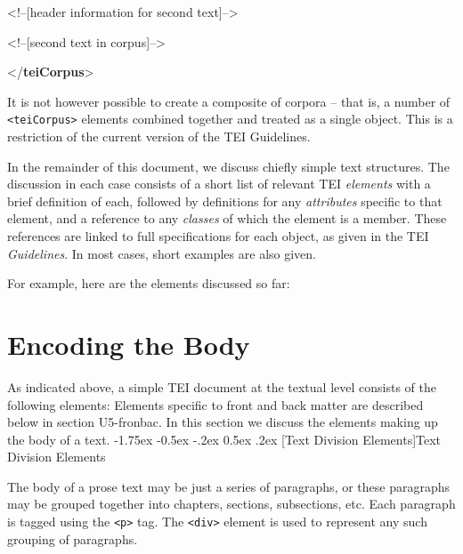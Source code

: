 \documentclass[11pt,twoside]{article}\makeatletter
\makeatletter
\renewcommand\section{\@startsection {section}{1}{\z@}%
     {-1.75ex \@plus -0.5ex \@minus -.2ex}%
     {0.5ex \@plus .2ex}%
     {\reset@font\Large\bfseries\sffamily}}
\renewcommand\subsection{\@startsection{subsection}{2}{\z@}%
     {-1.75ex\@plus -0.5ex \@minus- .2ex}%
     {0.5ex \@plus .2ex}%
     {\reset@font\Large\sffamily}}
\def\DivI{\section}
\def\DivII{\subsection}
\def\DivI{\chapter}
\def\DivII{\section}
\makeatother
\begin{document}
\begin{shaded}
\begin{it}<!--[header information for second text]-->\end{it}\mbox{}\newline 
\hspace*{6pt}\mbox{}\newline 
\hspace*{6pt}\mbox{}\newline 
\begin{it}<!--[second text in corpus]-->\end{it}\mbox{}\newline 
\hspace*{6pt}\mbox{}\newline 
{}\mbox{}\newline 
{</\textbf{teiCorpus}>}\end{shaded}\egroup\par \noindent  It is not however possible to create a composite of corpora -- that is, a number of \texttt{<teiCorpus>} elements combined together and treated as a single object. This is a restriction of the current version of the TEI Guidelines.\par
In the remainder of this document, we discuss chiefly simple text structures. The discussion in each case consists of a short list of relevant TEI \emph{elements} with a brief definition of each, followed by definitions for any \emph{attributes} specific to that element, and a reference to any \emph{classes} of which the element is a member. These references are linked to full specifications for each object, as given in the TEI \textit{Guidelines}. In most cases, short examples are also given.\par
For example, here are the elements discussed so far: 
\DivI[Encoding the Body]{Encoding the Body}\label{U5-body}\par
As indicated above, a simple TEI document at the textual level consists of the following elements:     Elements specific to front and back matter are described below in section U5-fronbac. In this section we discuss the elements making up the body of a text. 
\DivII[Text Division Elements]{Text Division Elements}\label{divs}\par
The body of a prose text may be just a series of paragraphs, or these paragraphs may be grouped together into chapters, sections, subsections, etc. Each paragraph is tagged using the \texttt{<p>} tag. The \texttt{<div>} element is used to represent any such grouping of paragraphs.     \par
\end{document}
